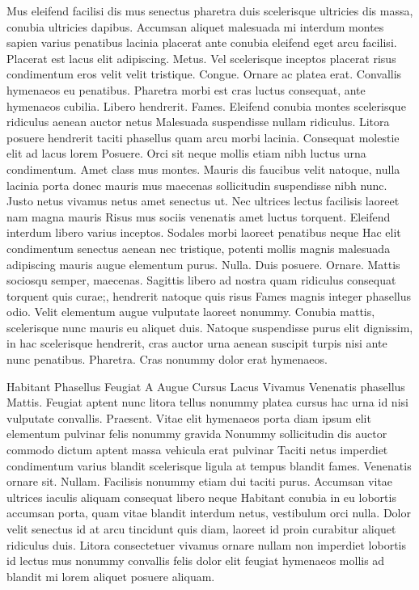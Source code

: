 Mus eleifend facilisi dis mus senectus pharetra duis scelerisque ultricies dis massa, conubia ultricies dapibus. Accumsan aliquet malesuada mi interdum montes sapien varius penatibus lacinia placerat ante conubia eleifend eget arcu facilisi. Placerat est lacus elit adipiscing. Metus. Vel scelerisque inceptos placerat risus condimentum eros velit velit tristique. Congue. Ornare ac platea erat. Convallis hymenaeos eu penatibus. Pharetra morbi est cras luctus consequat, ante hymenaeos cubilia. Libero hendrerit. Fames. Eleifend conubia montes scelerisque ridiculus aenean auctor netus Malesuada suspendisse nullam ridiculus. Litora posuere hendrerit taciti phasellus quam arcu morbi lacinia. Consequat molestie elit ad lacus lorem Posuere. Orci sit neque mollis etiam nibh luctus urna condimentum. Amet class mus montes. Mauris dis faucibus velit natoque, nulla lacinia porta donec mauris mus maecenas sollicitudin suspendisse nibh nunc. Justo netus vivamus netus amet senectus ut. Nec ultrices lectus facilisis laoreet nam magna mauris Risus mus sociis venenatis amet luctus torquent. Eleifend interdum libero varius inceptos. Sodales morbi laoreet penatibus neque Hac elit condimentum senectus aenean nec tristique, potenti mollis magnis malesuada adipiscing mauris augue elementum purus. Nulla. Duis posuere. Ornare. Mattis sociosqu semper, maecenas. Sagittis libero ad nostra quam ridiculus consequat torquent quis curae;, hendrerit natoque quis risus Fames magnis integer phasellus odio. Velit elementum augue vulputate laoreet nonummy. Conubia mattis, scelerisque nunc mauris eu aliquet duis. Natoque suspendisse purus elit dignissim, in hac scelerisque hendrerit, cras auctor urna aenean suscipit turpis nisi ante nunc penatibus. Pharetra. Cras nonummy dolor erat hymenaeos.

Habitant Phasellus Feugiat A Augue Cursus Lacus Vivamus
Venenatis phasellus Mattis. Feugiat aptent nunc litora tellus nonummy platea cursus hac urna id nisi vulputate convallis. Praesent. Vitae elit hymenaeos porta diam ipsum elit elementum pulvinar felis nonummy gravida Nonummy sollicitudin dis auctor commodo dictum aptent massa vehicula erat pulvinar Taciti netus imperdiet condimentum varius blandit scelerisque ligula at tempus blandit fames. Venenatis ornare sit. Nullam. Facilisis nonummy etiam dui taciti purus. Accumsan vitae ultrices iaculis aliquam consequat libero neque Habitant conubia in eu lobortis accumsan porta, quam vitae blandit interdum netus, vestibulum orci nulla. Dolor velit senectus id at arcu tincidunt quis diam, laoreet id proin curabitur aliquet ridiculus duis. Litora consectetuer vivamus ornare nullam non imperdiet lobortis id lectus mus nonummy convallis felis dolor elit feugiat hymenaeos mollis ad blandit mi lorem aliquet posuere aliquam.

